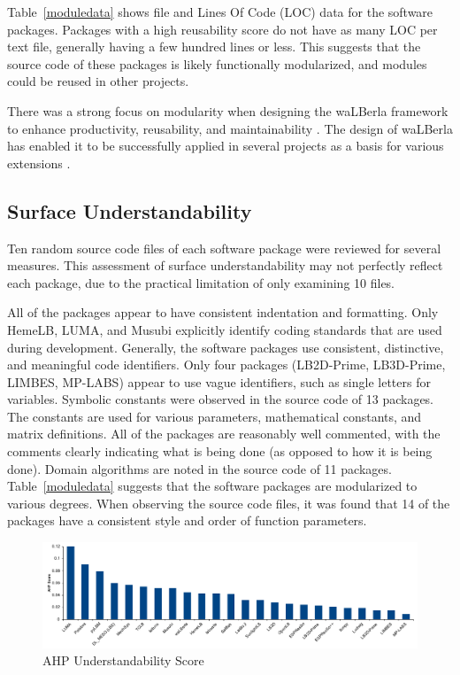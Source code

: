 \documentclass[final, 3p, times, authoryear]{elsarticle}
\begin{document}
Table~\ref{moduledata} shows file and Lines Of Code (LOC) data for the software
packages. Packages with a high reusability score do not have as many LOC per
text file, generally having a few hundred lines or less. This suggests that the
source code of these packages is likely functionally modularized, and modules
could be reused in other projects.

There was a strong focus on modularity when designing the waLBerla framework to
enhance productivity, reusability, and maintainability
\citep{bauer2021walberla}. The design of waLBerla has enabled it to be
successfully applied in several projects as a basis for various extensions
\citep{bauer2021walberla}.

\subsection{Surface Understandability}

Ten random source code files of each software package were reviewed for several
measures. This assessment of surface understandability may not perfectly reflect
each package, due to the practical limitation of only examining 10 files. 

All of the packages appear to have consistent indentation and formatting. Only HemeLB, LUMA, and Musubi explicitly identify coding standards that are used during development. Generally, the software packages use consistent, distinctive, and meaningful code identifiers. Only four packages (LB2D-Prime, LB3D-Prime, LIMBES, MP-LABS) appear to use vague identifiers, such as single letters for variables. Symbolic constants were observed in the source code of 13 packages. The constants are used for various parameters, mathematical constants, and matrix definitions. All of the packages are reasonably well commented, with the comments clearly indicating what is being done (as opposed to how it is being done). Domain algorithms are noted in the source code of 11 packages. Table~\ref{moduledata} suggests that the software packages are modularized to various degrees. When observing the source code files, it was found that 14 of the packages have a consistent style and order of function parameters.

\begin{figure}[h!]
	\begin{center}
		\includegraphics[width=1.0\textwidth]{./figures/understandability_chart.pdf}
		\caption{AHP Understandability Score}
		\label{Fig_Understandability}
	\end{center}
\end{figure}
\end{document}
